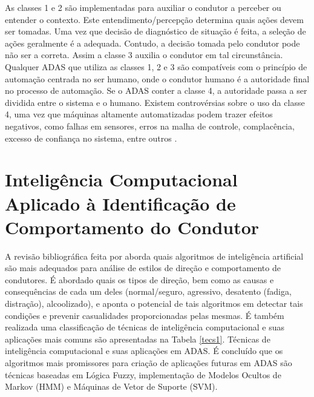 As classes 1 e 2 são implementadas para auxiliar o condutor a perceber ou entender o contexto. Este entendimento/percepção determina quais ações devem ser tomadas. Uma vez que decisão de diagnóstico de situação é feita, a seleção de ações geralmente é a adequada. Contudo, a decisão tomada pelo condutor pode não ser a correta. Assim a classe 3 auxilia o condutor em tal circunstância. Qualquer ADAS que utiliza as classes 1, 2 e 3 são compatíveis com o princípio de automação centrada no ser humano, onde o condutor humano é a autoridade final no processo de automação. Se o ADAS conter a classe 4, a autoridade passa a ser dividida entre o sistema e o humano. Existem controvérsias sobre o uso da classe 4, uma vez que máquinas altamente automatizadas podem trazer efeitos negativos, como falhas em sensores, erros na malha de controle, complacência, excesso de confiança no sistema, entre outros \cite{Inagaki2012}.



\section{Inteligência Computacional Aplicado à Identificação de Comportamento do Condutor}


A revisão bibliográfica feita por  aborda quais algoritmos de inteligência artificial são mais adequados para análise de estilos de direção e comportamento de condutores. É abordado quais os tipos de direção, bem como as causas e consequências de cada um deles (normal/seguro, agressivo, desatento (fadiga, distração), alcoolizado), e aponta o potencial de tais algoritmos em detectar tais condições e prevenir casualidades proporcionadas pelas mesmas. É também realizada uma classificação de técnicas de inteligência computacional e suas aplicações mais comuns são apresentadas na Tabela \ref{tecs1}. Técnicas de inteligência computacional e suas aplicações em ADAS. É concluído que os algoritmos mais promissores para criação de aplicações futuras em ADAS são técnicas baseadas em Lógica Fuzzy, implementação de Modelos Ocultos de Markov (HMM) e Máquinas de Vetor de Suporte (SVM).

